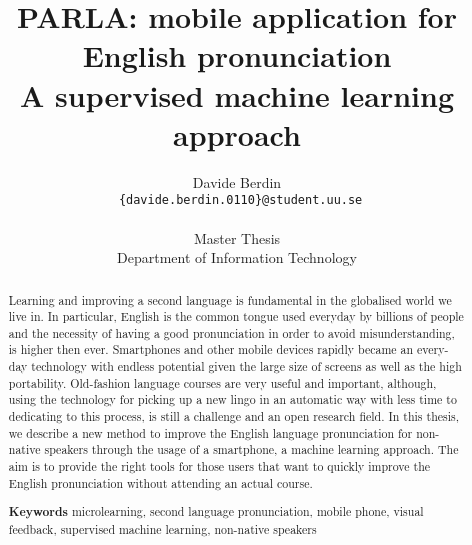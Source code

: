 \documentclass{report}
\title{PARLA: mobile application for English pronunciation \\ A supervised machine learning approach}
\author{Davide Berdin \\
  \texttt{ \{davide.berdin.0110\}@student.uu.se} \\
  \\ Master Thesis
  \\ Department of Information Technology}
\newcommand\blankpage{%
    \null
    \thispagestyle{empty}%
    \addtocounter{page}{-1}%
    \newpage}
\begin{document}
\maketitle


\blankpage

\blankpage

\begin{abstract}
Learning and improving a second language is fundamental in the globalised world we live in. In particular, English is the common tongue used everyday by billions of people and the necessity of having a good pronunciation in order to avoid misunderstanding, is higher then ever. Smartphones and other mobile devices rapidly became an every-day technology with endless potential given the large size of screens as well as the high portability. Old-fashion language courses are very useful and important, although, using the technology for picking up a new lingo in an automatic way with less time to dedicating to this process, is still a challenge and an open research field. In this thesis, we describe a new method to improve the English language pronunciation for non-native speakers through the usage of a smartphone, a machine learning approach. The aim is to provide the right tools for those users that want to quickly improve the English pronunciation without attending an actual course. \vspace{7in}

\noindent \textbf{Keywords} microlearning, second language pronunciation, mobile phone, visual feedback, supervised machine learning, non-native speakers
\end{abstract}

\blankpage

\renewcommand{\abstractname}{Acknowledgements}
\begin{abstract}

\end{abstract}

\blankpage

\tableofcontents{}

\listoffigures












{
	\nocite{*}
	
	
}

\begin{appendices}


%
\end{appendices}


\end{document}
